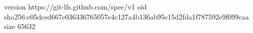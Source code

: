 version https://git-lfs.github.com/spec/v1
oid sha256:e05dced667e036336765057e4c127a4b136ab95e15d2fda1f787592e9f099caa
size 65632
